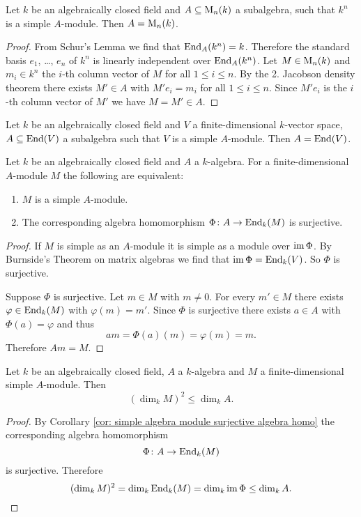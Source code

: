 \begin{cor}
 Let $k$ be an algebraically closed field and $A \subseteq \operatorname{M}_n(k)$ a subalgebra, such that $k^n$ is a simple $A$-module. Then $A = \operatorname{M}_n(k)$.
\end{cor}
\begin{proof}
 From Schur’s Lemma we find that $\operatorname{End}_A(k^n) = k$. Therefore the standard basis $e_1$, \dots, $e_n$ of $k^n$ is linearly independent over $\operatorname{End}_A(k^n)$. Let $M \in \operatorname{M}_n(k)$ and $m_i \in k^n$ the $i$-th column vector of $M$ for all $1 \leq i \leq n$. By the 2. Jacobson density theorem there exists $M' \in A$ with $M' e_i = m_i$ for all $1 \leq i \leq n$. Since $M' e_i$ is the $i$-th column vector of $M'$ we have $M = M' \in A$.
\end{proof}


\begin{cor}
 Let $k$ be an algebraically closed field and $V$ a finite-dimensional $k$-vector space, $A \subseteq \operatorname{End}(V)$ a subalgebra such that $V$ is a simple $A$-module. Then $A = \operatorname{End}(V)$.
\end{cor}


\begin{cor}\label{cor: simple algebra module surjective algebra homo}
 Let $k$ be an algebraically closed field and $A$ a  $k$-algebra. For a finite-dimensional $A$-module $M$ the following are equivalent:
 \begin{enumerate}[label=\emph{\roman*})]
  \item
   $M$ is a simple $A$-module.
  \item
   The corresponding algebra homomorphism $\Phi \colon A \to \operatorname{End}_k(M)$ is surjective.
 \end{enumerate}
\end{cor}
\begin{proof}
 If $M$ is simple as an $A$-module it is simple as a module over $\operatorname{im} \Phi$. By Burnside’s Theorem on matrix algebras we find that $\operatorname{im} \Phi = \operatorname{End}_k(V)$. So $\Phi$ is surjective.
 
 Suppose $\Phi$ is surjective. Let $m \in M$ with $m \neq 0$. For every $m' \in M$ there exists $\varphi \in \operatorname{End}_k(M)$ with $\varphi(m) = m'$. Since $\Phi$ is surjective there exists $a \in A$ with $\Phi(a) = \varphi$ and thus
 \[
  am = \Phi(a)(m) = \varphi(m) = m.
 \]
 Therefore $Am = M$.
\end{proof}


\begin{cor}\label{cor: dimension simple algebra modules}
 Let $k$ be an algebraically closed field, $A$ a $k$-algebra and $M$ a finite-dimensional simple $A$-module. Then
 \[
  (\dim_k M)^2 \leq \dim_k A.
 \]
\end{cor}
\begin{proof}
 By Corollary \ref{cor: simple algebra module surjective algebra homo} the corresponding algebra homomorphism
 \[
  \Phi \colon A \to \operatorname{End}_k(M)
 \]
 is surjective. Therefore
 \[
  (\dim_k M)^2 = \dim_k \operatorname{End}_k(M) = \dim_k \operatorname{im} \Phi \leq \dim_k A.
  \qedhere
 \]
\end{proof}


